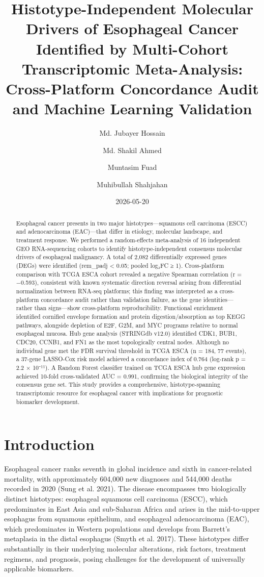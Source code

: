 \documentclass[
  12pt,
]{article}
\title{Histotype-Independent Molecular Drivers of Esophageal Cancer
Identified by Multi-Cohort Transcriptomic Meta-Analysis: Cross-Platform
Concordance Audit and Machine Learning Validation}
\author{Md. Jubayer Hossain \and Md. Shakil Ahmed \and Muntasim
Fuad \and Muhibullah Shahjahan}
\date{2026-05-20}
\begin{document}
\maketitle
\begin{abstract}
Esophageal cancer presents in two major histotypes---squamous cell
carcinoma (ESCC) and adenocarcinoma (EAC)---that differ in etiology,
molecular landscape, and treatment response. We performed a
random-effects meta-analysis of 16 independent GEO RNA-sequencing
cohorts to identify histotype-independent consensus molecular drivers of
esophageal malignancy. A total of 2,082 differentially expressed genes
(DEGs) were identified (rem\_padj \textless{} 0.05; \textbar pooled
log₂FC\textbar{} ≥ 1). Cross-platform comparison with TCGA ESCA cohort
revealed a negative Spearman correlation (r = −0.593), consistent with
known systematic direction reversal arising from differential
normalization between RNA-seq platforms; this finding was interpreted as
a cross-platform concordance audit rather than validation failure, as
the gene identities---rather than signs---show cross-platform
reproducibility. Functional enrichment identified cornified envelope
formation and protein digestion/absorption as top KEGG pathways,
alongside depletion of E2F, G2M, and MYC programs relative to normal
esophageal mucosa. Hub gene analysis (STRINGdb v12.0) identified CDK1,
BUB1, CDC20, CCNB1, and FN1 as the most topologically central nodes.
Although no individual gene met the FDR survival threshold in TCGA ESCA
(n = 184, 77 events), a 37-gene LASSO-Cox risk model achieved a
concordance index of 0.764 (log-rank p = 2.2 × 10⁻¹¹). A Random Forest
classifier trained on TCGA ESCA hub gene expression achieved 10-fold
cross-validated AUC = 0.991, confirming the biological integrity of the
consensus gene set. This study provides a comprehensive,
histotype-spanning transcriptomic resource for esophageal cancer with
implications for prognostic biomarker development.
\end{abstract}


\section{Introduction}\label{introduction}

Esophageal cancer ranks seventh in global incidence and sixth in
cancer-related mortality, with approximately 604,000 new diagnoses and
544,000 deaths recorded in 2020 (Sung et al. 2021). The disease
encompasses two biologically distinct histotypes: esophageal squamous
cell carcinoma (ESCC), which predominates in East Asia and sub-Saharan
Africa and arises in the mid-to-upper esophagus from squamous
epithelium, and esophageal adenocarcinoma (EAC), which predominates in
Western populations and develops from Barrett's metaplasia in the distal
esophagus (Smyth et al. 2017). These histotypes differ substantially in
their underlying molecular alterations, risk factors, treatment
regimens, and prognosis, posing challenges for the development of
universally applicable biomarkers.
\end{document}
